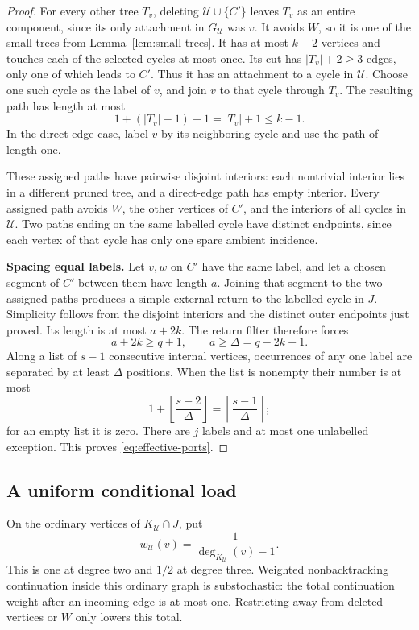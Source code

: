 \documentclass[11pt,a4paper]{article}
\numberwithin{equation}{section}
\theoremstyle{definition}
\theoremstyle{remark}
\newcommand{\proofstep}[1]{\par\addvspace{\medskipamount}\noindent\textbf{#1}\enspace\ignorespaces}
\newcommand{\ceil}[1]{\left\lceil#1\right\rceil}
\newcommand{\floor}[1]{\left\lfloor#1\right\rfloor}
\begin{document}
\begin{proof}
For every other tree $T_v$, deleting $\mathcal U\cup\{C'\}$ leaves $T_v$ as an entire component, since its only attachment in $G_{\mathcal U}$ was $v$. It avoids $W$, so it is one of the small trees from Lemma~\ref{lem:small-trees}. It has at most $k-2$ vertices and touches each of the selected cycles at most once. Its cut has $|T_v|+2\ge3$ edges, only one of which leads to $C'$. Thus it has an attachment to a cycle in $\mathcal U$. Choose one such cycle as the label of $v$, and join $v$ to that cycle through $T_v$. The resulting path has length at most
\[
 1+(|T_v|-1)+1=|T_v|+1\le k-1.
\]
In the direct-edge case, label $v$ by its neighboring cycle and use the path of length one.

These assigned paths have pairwise disjoint interiors: each nontrivial interior lies in a different pruned tree, and a direct-edge path has empty interior. Every assigned path avoids $W$, the other vertices of $C'$, and the interiors of all cycles in $\mathcal U$. Two paths ending on the same labelled cycle have distinct endpoints, since each vertex of that cycle has only one spare ambient incidence.

\proofstep{Spacing equal labels.}
Let $v,w$ on $C'$ have the same label, and let a chosen segment of $C'$ between them have length $a$. Joining that segment to the two assigned paths produces a simple external return to the labelled cycle in $J$. Simplicity follows from the disjoint interiors and the distinct outer endpoints just proved. Its length is at most $a+2k$. The return filter therefore forces
\[
 a+2k\ge q+1,\qquad a\ge\Delta=q-2k+1.
\]
Along a list of $s-1$ consecutive internal vertices, occurrences of any one label are separated by at least $\Delta$ positions. When the list is nonempty their number is at most
\[
 1+\floor{\frac{s-2}{\Delta}}
   =\ceil{\frac{s-1}{\Delta}};
\]
for an empty list it is zero. There are $j$ labels and at most one unlabelled exception. This proves \eqref{eq:effective-ports}.
\end{proof}

\subsection{A uniform conditional load}
On the ordinary vertices of $K_{\mathcal U}\cap J$, put
\[
 w_{\mathcal U}(v)=\frac1{\deg_{K_{\mathcal U}}(v)-1}.
\]
This is one at degree two and $1/2$ at degree three. Weighted nonbacktracking continuation inside this ordinary graph is substochastic: the total continuation weight after an incoming edge is at most one. Restricting away from deleted vertices or $W$ only lowers this total.
\end{document}
